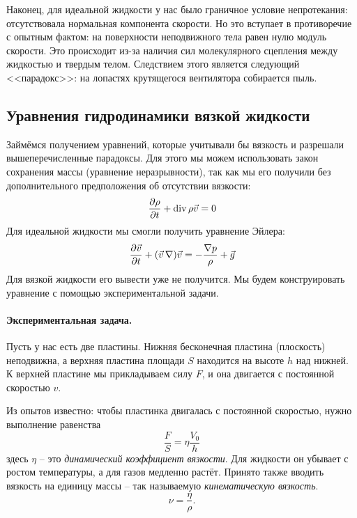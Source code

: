 Наконец, для идеальной жидкости у нас было граничное условие непротекания: отсутствовала нормальная компонента скорости. Но это вступает в противоречие с опытным фактом: на поверхности неподвижного тела равен нулю модуль скорости. Это происходит из-за наличия сил молекулярного сцепления между жидкостью и твердым телом. Следствием этого является следующий <<парадокс>>: на лопастях крутящегося вентилятора собирается пыль. 

\subsection{Уравнения гидродинамики вязкой жидкости}
\label{ss:fsev}
Займёмся получением уравнений, которые учитывали бы вязкость и разрешали вышеперечисленные парадоксы. Для этого мы можем использовать закон сохранения массы (уравнение неразрывности), так как мы его получили без дополнительного предположения об отсутствии вязкости:
\begin{equation}
    \pdv{\rho}{t}+\operatorname{div} \rho \vec{v} = 0
\end{equation}
Для идеальной жидкости мы смогли получить уравнение Эйлера:
\begin{equation}
    \pdv{\vec{v}}{t}+(\vec{v}\,\nabla)\vec{v} = -\frac{\nabla p}{\rho}+\vec{g}
\end{equation}
Для вязкой жидкости его вывести уже не получится. Мы будем конструировать уравнение с помощью экспериментальной задачи.

\paragraph{Экспериментальная задача.} Пусть у нас есть две пластины. Нижняя бесконечная пластина (плоскость) неподвижна, а верхняя пластина площади $S$ находится на высоте $h$ над нижней. К верхней пластине мы прикладываем силу $F$, и она двигается с постоянной скоростью $v$.

Из опытов известно: чтобы пластинка двигалась с постоянной скоростью, нужно выполнение равенства
\begin{equation}
	\label{eq:fsev}
    \frac{F}{S} = \eta \frac{V_0}{h}
\end{equation}
здесь $\eta$ -- это \textit{динамический коэффициент вязкости}. Для жидкости он убывает с ростом температуры, а для газов медленно растёт.
Принято также вводить вязкость на единицу массы -- так называемую \textit{кинематическую вязкость}.
\begin{equation}
    \nu = \frac{\eta}{\rho}.
\end{equation}


